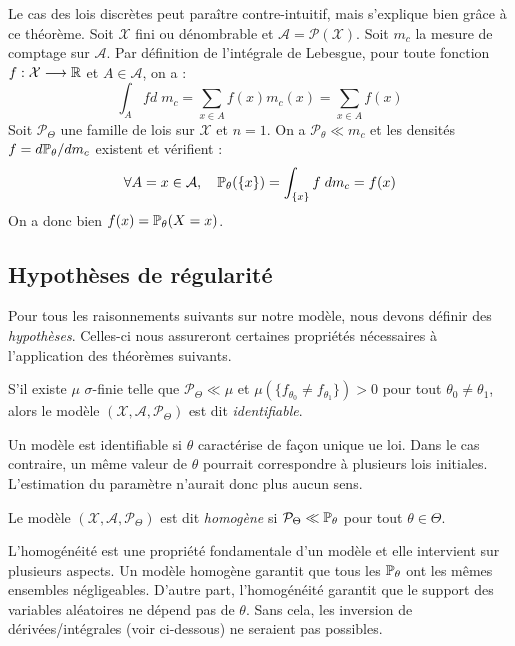 \begin{remark}
    Le cas des lois discrètes peut paraître contre-intuitif, mais s'explique bien 
    grâce à ce théorème. Soit $ \mathcal{X}$ fini ou dénombrable et $ \mathcal{A} = \mathcal{P}( \mathcal{X})$. 
    Soit $ m_c$ la mesure de comptage sur $ \mathcal{A}$. Par définition de l'intégrale de Lebesgue, pour toute 
    fonction $ f : \mathcal{X} \longrightarrow \mathbb{R}$ et $ A \in \mathcal{A}$, on a : 
        $$ \int_A f d \; m_c = \sum_{x \in A} f(x) m_c(x) = \sum_{x \in A} f(x) $$ 
    Soit $ \mathcal{P}_\Theta$ une famille de lois sur $ \mathcal{X}$ et $n = 1$. On a $ \mathcal{P}_\theta \ll m_c$ et 
    les densités $f = d \mathbb{P}_\theta / d m_c$ existent et vérifient :
        $$ \forall A = {x} \in \mathcal{A}, \quad \mathbb{P}_\theta(\{x\}) = \int_{\{x\}} f \; d m_c = f(x) $$
    On a donc bien $f(x) = \mathbb{P}_\theta(X = x)$. 
\end{remark}

\subsection{Hypothèses de régularité}

Pour tous les raisonnements suivants sur notre modèle, nous devons définir des \emph{hypothèses}. 
Celles-ci nous assureront certaines propriétés nécessaires à l'application des théorèmes suivants. 


\begin{definition}
    S'il existe $ \mu$ $ \sigma$-finie telle que $ \mathcal{P}_\Theta \ll \mu$ et $ \mu(\{f_{\theta_0} \not = f_{\theta_1}\}) > 0$ 
    pour tout $ \theta_0 \not = \theta_1$, alors le modèle $( \mathcal{X}, \mathcal{A}, \mathcal{P}_\Theta)$ 
    est dit \emph{identifiable}. 
\end{definition}

Un modèle est identifiable si $ \theta$ caractérise de façon unique ue loi. Dans le cas contraire, 
un même valeur de $ \theta$ pourrait correspondre à plusieurs lois initiales. L'estimation 
du paramètre n'aurait donc plus aucun sens. 

\begin{definition}
    Le modèle $( \mathcal{X}, \mathcal{A}, \mathcal{P}_\Theta)$ est dit \emph{homogène} si 
    $ \mathcal{P}_\Theta \ll \mathbb{P}_\theta$ pour tout $ \theta \in \Theta$. 
\end{definition}

L'homogénéité est une propriété fondamentale d'un modèle et elle intervient sur 
plusieurs aspects. Un modèle homogène garantit que tous les $ \mathbb{P}_\theta$ ont les mêmes 
ensembles négligeables. D'autre part, l'homogénéité garantit que le support des variables 
aléatoires ne dépend pas de $ \theta$. Sans cela, les inversion de dérivées/intégrales 
(voir ci-dessous) ne seraient pas possibles. 

